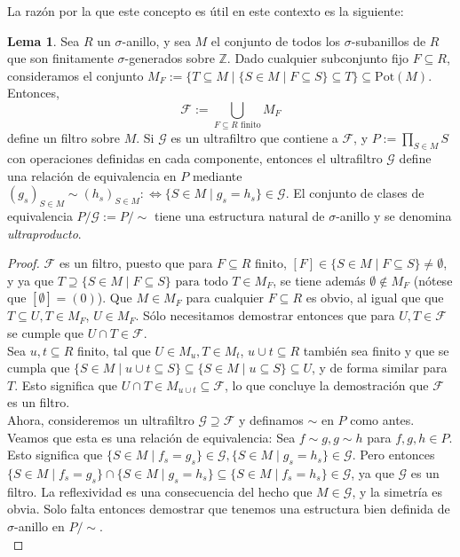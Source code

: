 \documentclass[letterpaper]{article}
\def\Z{\mathbb{Z}}
\def\fa{\text{ para todo }}
\def\s{\sigma}
\theoremstyle{definition}
\newtheorem{lem}[Satz]{Lema}
\begin{document}
La raz\'on por la que este concepto es \'util en este contexto es la siguiente:

\begin{lem}\label{lemmafilters}
Sea $R$ un $\sigma$-anillo, y sea $M$ el conjunto de todos los $\sigma$-subanillos de $R$ que son finitamente $\s$-generados sobre $\Z$. Dado cualquier subconjunto fijo $F \subseteq R$, consideramos el conjunto $M_F:= \{ T \subseteq M \mid \{S \in M \mid F \subseteq S \} \subseteq T \} \subseteq \text{Pot}(M)$. Entonces, \[ \mathcal{F}:= \bigcup_{ F \subseteq R \text{ finito} } M_F \]
 define un filtro sobre $M$. Si $\mathcal{G}$ es un ultrafiltro que contiene a $\mathcal{F}$, y $P:= \prod_{S \in M} S$ con operaciones definidas en cada componente,
 entonces el ultrafiltro $\mathcal{G}$ define una relaci\'on de equivalencia en $P$ mediante $(g_s)_{S \in M} \sim (h_s)_{S \in M} : \Leftrightarrow \{ S \in M \mid g_s = h_s \} \in \mathcal{G}$. 
El conjunto de clases de equivalencia $P/\mathcal{G}:= P/\sim$ tiene una estructura natural de $\sigma$-anillo y se denomina \emph{ultraproducto}. %
\begin{proof}
$\mathcal{F}$ es un filtro, puesto que para $F \subseteq R$ finito, $[F] \in \{ S \in M \mid F \subseteq S \} \neq \emptyset$, y ya que $T \supseteq \{ S \in M \mid F \subseteq S \} \fa T \in M_F$, se tiene adem\'as $\emptyset \notin M_F$ (n\'otese que $[\emptyset] = (0)$).
  Que $M \in M_F$ para cualquier $F \subseteq R$ es obvio, al igual que que $T \subseteq U, T \in M_F$, $U \in M_F$. S\'olo necesitamos demostrar entonces que para $U,T \in \mathcal{F}$ se cumple que $U \cap T \in \mathcal{F}$.\\
	
  Sea $u, t \subseteq R$ finito, tal que $U \in M_u, T \in M_t$, $u \cup t \subseteq R$ tambi\'en sea finito y que se cumpla que $\{ S \in M \mid u \cup t \subseteq S \} \subseteq \{ S \in M \mid u \subseteq S \} \subseteq U$,
 y de forma similar para $T$. Esto significa que $U \cap T \in M_{u \cup t} \subseteq \mathcal{F}$, lo que concluye la demostraci\'on que $\mathcal{F}$ es un filtro.\\

 Ahora, consideremos un ultrafiltro $\mathcal{G} \supseteq \mathcal{F}$ y definamos $\sim$ en $P$ como antes. Veamos que esta es una relaci\'on de equivalencia: Sea $f \sim g, g \sim h$ para $f,g,h \in P$. 
 Esto significa que  $\{ S \in M \mid f_s = g_s \} \in \mathcal{G}, \{ S \in M \mid g_s = h_s \} \in \mathcal{G}$. Pero entonces $\{ S \in M \mid f_s = g_s \} \cap \{ S \in M \mid g_s = h_s \} \subseteq \{ S \in M \mid f_s = h_s \} \in \mathcal{G}$, ya que  $\mathcal{G}$ es un filtro.
 La reflexividad es una consecuencia del hecho que $M \in \mathcal{G}$, y la simetr\'ia es obvia. Solo falta entonces demostrar que tenemos una estructura bien definida de $\sigma$-anillo en $P/ \sim$.\\


\end{proof}
\end{lem}
\end{document}
